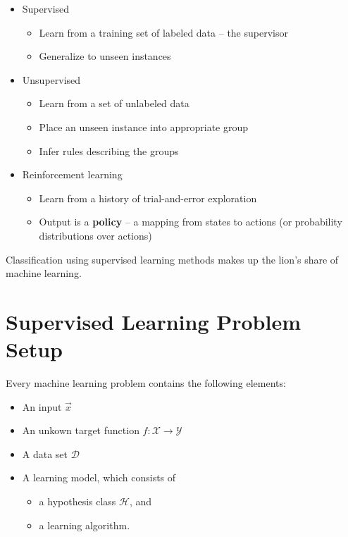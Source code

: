 \documentclass[11pt]{article}
\begin{document}
\begin{itemize}
\item Supervised
\begin{itemize}
\item Learn from a training set of labeled data -- the supervisor
\item Generalize to unseen instances
\end{itemize}

\item Unsupervised
\begin{itemize}
\item Learn from a set of unlabeled data
\item Place an unseen instance into appropriate group
\item Infer rules describing the groups
\end{itemize}

\item Reinforcement learning
\begin{itemize}
\item Learn from a history of trial-and-error exploration
\item Output is a \textbf{policy} -- a mapping from states to actions (or probability distributions over actions)
\end{itemize}
\end{itemize}

Classification using supervised learning methods makes up the lion's share of machine learning.
\section{Supervised Learning Problem Setup}
\label{sec:org447be2f}

Every machine learning problem contains the following elements:

\begin{itemize}
\item An input \(\vec{x}\)
\item An unkown target function \(f: \mathcal{X} \rightarrow \mathcal{Y}\)
\item A data set \(\mathcal{D}\)
\item A learning model, which consists of
\begin{itemize}
\item a hypothesis class \(\mathcal{H}\), and
\item a learning algorithm.
\end{itemize}
\end{itemize}
\end{document}
